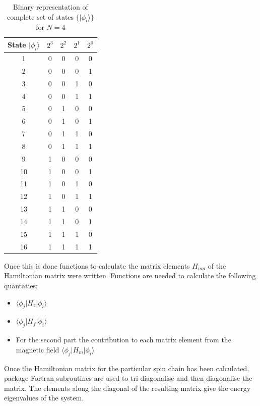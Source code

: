 \documentclass[a4paper]{IEEEtran}
\begin{document}
    \begin{table}
    \caption{Binary representation of complete set of states $\{|\phi_i\rangle\}$ for $N=4$} 
    \label{tbl:binary} 
    \begin{center}
        \begin{tabular}{|c||c|c|c|c|} \hline
        State $|\phi_i\rangle$ & $2^3$ & $2^2$ & $2^1$ & $2^0$ \\ \hline \hline
        1 & 0 & 0 & 0 & 0 \\ \hline 
        2 & 0 & 0 & 0 & 1 \\ \hline
        3 & 0 & 0 & 1 & 0 \\ \hline
        4 & 0 & 0 & 1 & 1 \\ \hline
        5 & 0 & 1 & 0 & 0 \\ \hline
        6 & 0 & 1 & 0 & 1 \\ \hline
        7 & 0 & 1 & 1 & 0 \\ \hline
        8 & 0 & 1 & 1 & 1 \\ \hline
        9 & 1 & 0 & 0 & 0 \\ \hline
       10 & 1 & 0 & 0 & 1 \\ \hline
       11 & 1 & 0 & 1 & 0 \\ \hline
       12 & 1 & 0 & 1 & 1 \\ \hline
       13 & 1 & 1 & 0 & 0 \\ \hline
       14 & 1 & 1 & 0 & 1 \\ \hline
       15 & 1 & 1 & 1 & 0 \\ \hline
       16 & 1 & 1 & 1 & 1 \\ \hline
       \end{tabular}
    \end{center}
    \end{table} 

    Once this is done functions to calculate the matrix elements $H_{mn}$ of the Hamiltonian
    matrix were written. Functions are needed to calculate the following quantaties:
    \begin{itemize}
        \item $\langle\phi_j|H_z|\phi_i\rangle$
        \item $\langle\phi_j|H_f|\phi_i\rangle$
        \item For the second part the contribution to each matrix element from the
              magnetic field $\langle\phi_j|H_m|\phi_i\rangle$
    \end{itemize}
    Once the Hamiltonian matrix for the particular spin chain has been calculated,
    package Fortran subroutines are used to tri-diagonalise and then diagonalise 
    the matrix. The elements along the diagonal of the resulting matrix give the
    energy eigenvalues of the system.
\end{document}
